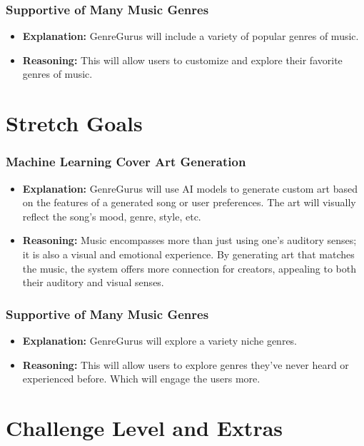 \documentclass{article}
\begin{document}
\subsubsection*{Supportive of Many Music Genres}
\begin{itemize}
    \item \textbf{Explanation:} GenreGurus will include a variety of popular genres of music.
    \item \textbf{Reasoning:} This will allow users to customize and explore their favorite genres of music.
\end{itemize}


\section{Stretch Goals}
\subsubsection*{Machine Learning Cover Art Generation}
\begin{itemize}
    \item \textbf{Explanation:} GenreGurus will use AI models to generate custom art based on the features of a generated song or user preferences. The art will visually reflect the song's mood, genre, style, etc.
    \item \textbf{Reasoning:} Music encompasses more than just using one's auditory senses; it is also a visual and emotional experience. By generating art that matches the music, the system offers more connection for creators, appealing to both their auditory and visual senses.
\end{itemize}

\subsubsection*{Supportive of Many Music Genres}
\begin{itemize}
    \item \textbf{Explanation:} GenreGurus will explore a variety niche genres.
    \item \textbf{Reasoning:} This will allow users to explore genres they’ve never heard or experienced before. Which will engage the users more.
\end{itemize}

\section{Challenge Level and Extras}
\end{document}
